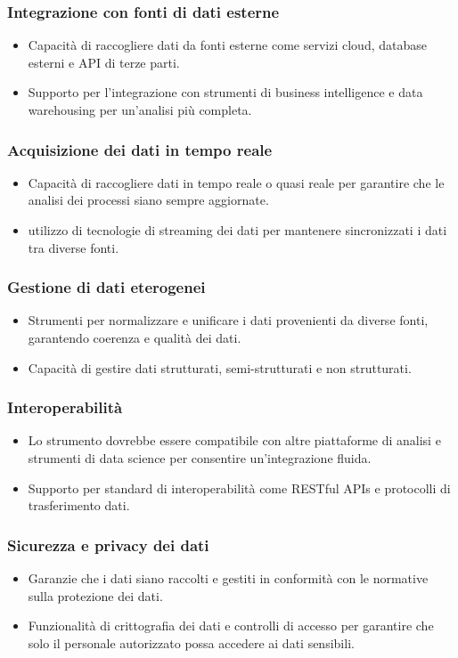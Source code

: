 \documentclass{article}
\begin{document}
\subsubsection{Integrazione con fonti di dati esterne}
\begin{itemize}
    \item Capacità di raccogliere dati da fonti esterne come servizi cloud, database esterni e API di terze parti.
    \item Supporto per l'integrazione con strumenti di business intelligence e data warehousing per un'analisi più completa.
\end{itemize}
\subsubsection{Acquisizione dei dati in tempo reale}
\begin{itemize}
    \item Capacità di raccogliere dati in tempo reale o quasi reale per garantire che le analisi dei processi siano sempre aggiornate.
    \item utilizzo di tecnologie di streaming dei dati per mantenere sincronizzati i dati tra diverse fonti.
\end{itemize}
\subsubsection{Gestione di dati eterogenei}
\begin{itemize}
    \item Strumenti per normalizzare e unificare i dati provenienti da diverse fonti, garantendo coerenza e qualità dei dati.
    \item Capacità di gestire dati strutturati, semi-strutturati e non strutturati.
\end{itemize}
\subsubsection{Interoperabilità}
\begin{itemize}
    \item Lo strumento dovrebbe essere compatibile con altre piattaforme di analisi e strumenti di data science per consentire un'integrazione fluida.
    \item Supporto per standard di interoperabilità come RESTful APIs e protocolli di trasferimento dati.
\end{itemize}
\subsubsection{Sicurezza e privacy dei dati}
\begin{itemize}
    \item Garanzie che i dati siano raccolti e gestiti in conformità con le normative sulla protezione dei dati.
    \item Funzionalità di crittografia dei dati e controlli di accesso per garantire che solo il personale autorizzato possa accedere ai dati sensibili.
\end{itemize}
\end{document}
